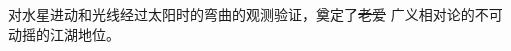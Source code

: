 \documentclass[CJK,13pt]{beamer}
\begin{document}
  \begin{frame}
    
    对水星进动和光线经过太阳时的弯曲的观测验证，奠定了\sout{老爱} 广义相对论的不可动摇的江湖地位。

  \end{frame}  
\ech
\end{document}
